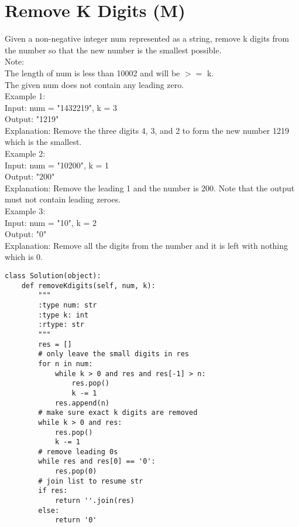 \section{Remove K Digits (M)}
Given a non-negative integer num represented as a string, remove k digits from the number so that the new number is the smallest possible.\\

Note:\\

    The length of num is less than 10002 and will be $>=$ k.\\
    The given num does not contain any leading zero.\\

Example 1:\\
Input: num = "1432219", k = 3\\
Output: "1219"\\
Explanation: Remove the three digits 4, 3, and 2 to form the new number 1219 which is the smallest.\\

Example 2:\\
Input: num = "10200", k = 1\\
Output: "200"\\
Explanation: Remove the leading 1 and the number is 200. Note that the output must not contain leading zeroes.\\

Example 3:\\
Input: num = "10", k = 2\\
Output: "0"\\
Explanation: Remove all the digits from the number and it is left with nothing which is 0.\\

\begin{lstlisting}
class Solution(object):
    def removeKdigits(self, num, k):
        """
        :type num: str
        :type k: int
        :rtype: str
        """
        res = []
        # only leave the small digits in res
        for n in num:
            while k > 0 and res and res[-1] > n:
                res.pop()
                k -= 1
            res.append(n)
        # make sure exact k digits are removed
        while k > 0 and res:
            res.pop()
            k -= 1
        # remove leading 0s
        while res and res[0] == '0':
            res.pop(0)
        # join list to resume str
        if res:
            return ''.join(res)
        else:
            return '0'
\end{lstlisting}

